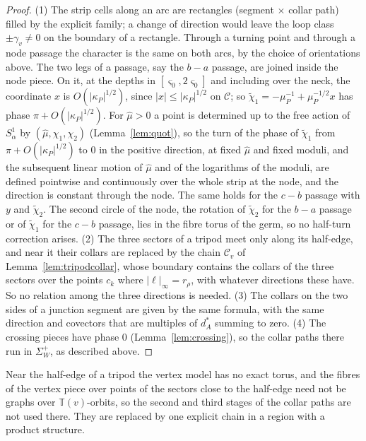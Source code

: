 \begin{proof}
(1) The strip cells along an arc are rectangles (segment $\times$ collar path) filled by the explicit family; a change of
direction would leave the loop class $\pm\gamma_v\ne0$ on the boundary of a rectangle. Through a turning point and through a
node passage the character is the same on both arcs, by the choice of orientations above. The two legs of a passage, say the
$b-a$ passage, are joined inside the node piece. On it, at the depths in $[\varsigma_0,2\varsigma_0]$ and including over
the neck, the coordinate $x$ is $O(|\kappa_P|^{1/2})$, since $|x|\le|\kappa_P|^{1/2}$ on $\mathscr C$; so
$\tilde\chi_1=-\mu_P^{-1}+\mu_P^{-1/2}x$ has phase $\pi+O(|\kappa_P|^{1/2})$. For $\hat\mu>0$ a point is determined up to
the free action of $S^1_\alpha$ by $(\hat\mu,\chi_1,\chi_2)$ (Lemma~\ref{lem:quot}), so the turn of the phase of
$\tilde\chi_1$ from $\pi+O(|\kappa_P|^{1/2})$ to $0$ in the positive direction, at fixed $\hat\mu$ and fixed moduli, and the
subsequent linear motion of $\hat\mu$ and of the logarithms of the moduli, are defined pointwise and continuously over the
whole strip at the node, and the direction is constant through the node. The
same holds for the $c-b$ passage with $y$ and $\tilde\chi_2$. The
second circle of the node, the rotation of $\tilde\chi_2$ for the $b-a$ passage or of $\tilde\chi_1$ for the $c-b$
passage, lies in the fibre torus of the germ, so no half-turn correction arises.
(2) The three sectors of a tripod meet only along its half-edge, and near it their collars are replaced by the chain
$\mathscr C_v$ of Lemma~\ref{lem:tripodcollar}, whose boundary contains the collars of the three sectors over the
points $c_k$ where $|\ell|_\infty=r_\rho$, with whatever directions these have. So no relation among the three
directions is needed.
(3) The collars on the two sides of a junction segment are given by the same formula, with the same direction and
covectors that are multiples of $d^*_A$ summing to zero.
(4) The crossing pieces have phase $0$ (Lemma~\ref{lem:crossing}), so the collar paths there run in $\Sigma^+_W$, as
described above.
\end{proof}

Near the half-edge of a tripod the vertex model has no exact torus, and the fibres of the vertex piece over points of the
sectors close to the half-edge need not be graphs over $\mathbb T(v)$-orbits, so the second and third stages of the collar
paths are not used there. They are replaced by one explicit chain in a region with a product structure.

